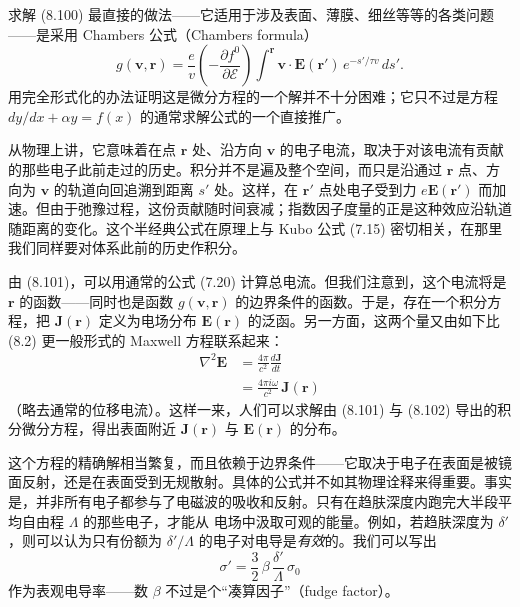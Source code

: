 求解 (8.100) 最直接的做法——它适用于涉及表面、薄膜、细丝等等的各类问题——是采用 Chambers 公式（Chambers formula）
\begin{equation*}
g(\mathbf{v},\mathbf{r}) = \frac{e}{v}\left(-\frac{\partial f^0}{\partial\mathcal{E}}\right)\int^{\mathbf{r}} \mathbf{v}\cdot\mathbf{E}(\mathbf{r}')\,e^{-s'/\tau v}\,ds'. \tag{8.101}
\end{equation*}
用完全形式化的办法证明这是微分方程的一个解并不十分困难；它只不过是方程 $dy/dx+\alpha y=f(x)$ 的通常求解公式的一个直接推广。

从物理上讲，它意味着在点 $\mathbf{r}$ 处、沿方向 $\mathbf{v}$ 的电子电流，取决于对该电流有贡献的那些电子此前走过的历史。积分并不是遍及整个空间，而只是沿通过 $\mathbf{r}$ 点、方向为 $\mathbf{v}$ 的轨道向回追溯到距离 $s'$ 处。这样，在 $\mathbf{r}'$ 点处电子受到力 $e\mathbf{E}(\mathbf{r}')$ 而加速。但由于弛豫过程，这份贡献随时间衰减；指数因子度量的正是这种效应沿轨道随距离的变化。这个半经典公式在原理上与 Kubo 公式 (7.15) 密切相关，在那里我们同样要对体系此前的历史作积分。

由 (8.101)，可以用通常的公式 (7.20) 计算总电流。但我们注意到，这个电流将是 $\mathbf{r}$ 的函数——同时也是函数 $g(\mathbf{v},\mathbf{r})$ 的边界条件的函数。于是，存在一个积分方程，把 $\mathbf{J}(\mathbf{r})$ 定义为电场分布 $\mathbf{E}(\mathbf{r})$ 的泛函。另一方面，这两个量又由如下比 (8.2) 更一般形式的 Maxwell 方程联系起来：
\begin{align*}
\nabla^2\mathbf{E} &= \frac{4\pi}{c^2}\frac{d\mathbf{J}}{dt} \\
&= \frac{4\pi i\omega}{c^2}\,\mathbf{J}(\mathbf{r}) \tag{8.102}
\end{align*}
（略去通常的位移电流）。这样一来，人们可以求解由 (8.101) 与 (8.102) 导出的积分微分方程，得出表面附近 $\mathbf{J}(\mathbf{r})$ 与 $\mathbf{E}(\mathbf{r})$ 的分布。

这个方程的精确解相当繁复，而且依赖于边界条件——它取决于电子在表面是被镜面反射，还是在表面受到无规散射。具体的公式并不如其物理诠释来得重要。事实是，并非所有电子都参与了电磁波的吸收和反射。只有在趋肤深度内跑完大半段平均自由程 $\Lambda$ 的那些电子，才能从
电场中汲取可观的能量。例如，若趋肤深度为 $\delta'$，则可以认为只有份额为 $\delta'/\Lambda$ 的电子对电导是\emph{有效}的。我们可以写出
\begin{equation*}
\sigma' = \frac{3}{2}\,\beta\,\frac{\delta'}{\Lambda}\,\sigma_0 \tag{8.103}
\end{equation*}
作为表观电导率——数 $\beta$ 不过是个“凑算因子”（fudge factor）。

